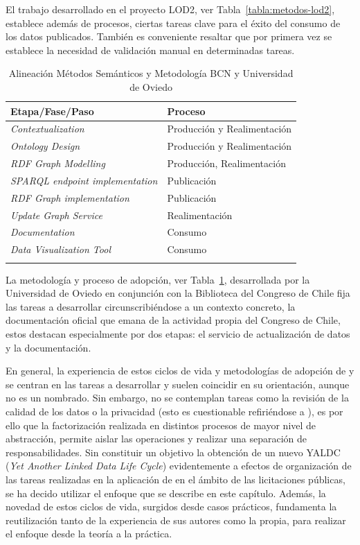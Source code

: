 El trabajo desarrollado en el proyecto LOD2, ver Tabla~\ref{tabla:metodos-lod2}, establece además
de procesos, ciertas tareas clave para el éxito del consumo de los datos publicados. También
es conveniente resaltar que por primera vez se establece la necesidad de validación manual en determinadas tareas.

\begin{longtable}[c]{|p{6cm}|p{8cm}|} 

\hline

  \textbf{Etapa/Fase/Paso} &  \textbf{Proceso} \\\hline

\endhead
\textit{Contextualization} & Producción y Realimentación \\ \hline
\textit{Ontology Design} & Producción y Realimentación \\ \hline
\textit{RDF Graph Modelling} & Producción, Realimentación \\ \hline
\textit{SPARQL endpoint implementation} & Publicación \\ \hline
\textit{RDF Graph implementation} & Publicación \\ \hline
\textit{Update Graph Service} & Realimentación \\ \hline
\textit{Documentation} & Consumo \\ \hline
\textit{Data Visualization Tool} & Consumo \\ \hline
\hline
\caption{Alineación Métodos Semánticos y Metodología BCN y Universidad de Oviedo}  \label{tabla:metodos-bcn}\\    
\end{longtable}

La metodología y proceso de adopción, ver Tabla~\ref{tabla:metodos-bcn}, desarrollada por la Universidad de Oviedo en conjunción con la 
Biblioteca del Congreso de Chile fija las tareas a desarrollar circunscribiéndose a un contexto concreto, la documentación 
oficial que emana de la actividad propia del Congreso de Chile, estos destacan especialmente por dos etapas: el servicio de actualización de datos
y la documentación.

En general, la experiencia de estos ciclos de vida y metodologías de adopción de \linkeddata y \lod se centran
en las tareas a desarrollar y suelen coincidir en su orientación, aunque no es un nombrado. Sin embargo,
no se contemplan tareas como la revisión de la calidad de los datos o la privacidad (esto es cuestionable refiriéndose a \lod), 
es por ello que la factorización realizada en distintos procesos de mayor nivel de abstracción, permite aislar 
las operaciones y realizar una separación de responsabilidades. Sin constituir un objetivo la obtención de un nuevo 
YALDC (\textit{Yet Another Linked Data Life Cycle}) evidentemente a efectos de organización de las tareas realizadas
en la aplicación de \linkeddata en el ámbito de las licitaciones públicas, se ha decido utilizar el enfoque
que se describe en este capítulo. Además, la novedad de estos ciclos de vida, surgidos desde casos prácticos, 
fundamenta la reutilización tanto de la experiencia de sus autores como la propia, para realizar el enfoque desde la teoría a la práctica.


